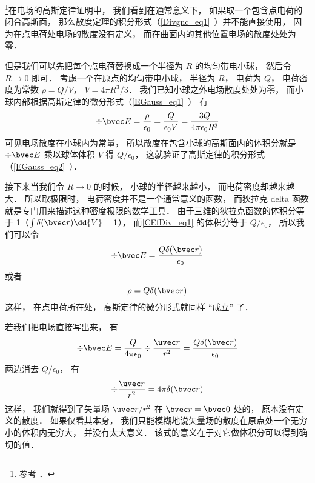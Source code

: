 

\footnote{参考 \cite{GriffE}．}在电场的高斯定律证明中， 我们看到在通常意义下， 如果取一个包含点电荷的闭合高斯面， 那么散度定理的积分形式（\autoref{Divgnc_eq1}~）并不能直接使用， 因为在点电荷处电场的散度没有定义， 而在曲面内的其他位置电场的散度处处为零．

但是我们可以先把每个点电荷替换成一个半径为 $R$ 的均匀带电小球， 然后令 $R\to 0$ 即可． 考虑一个在原点的均匀带电小球， 半径为 $R$， 电荷为 $Q$， 电荷密度为常数 $\rho = Q/V$， $V = 4\pi R^3/3$． 我们已知小球之外电场散度处处为零， 而小球内部根据高斯定律的微分形式（\autoref{EGauss_eq1}~） 有
\begin{equation}\label{CEfDiv_eq1}
\div \bvec E = \frac{\rho}{\epsilon_0} = \frac{Q}{\epsilon_0 V} = \frac{3Q}{4\pi \epsilon_0 R^3}
\end{equation}
可见电场散度在小球内为常量， 所以散度在包含小球的高斯面内的体积分就是 $\div \bvec E$ 乘以球体体积 $V$ 得 $Q/\epsilon_0$， 这就验证了高斯定律的积分形式（\autoref{EGauss_eq2}~）．

接下来当我们令 $R\to 0$ 的时候， 小球的半径越来越小， 而电荷密度却越来越大． 所以取极限时， 电荷密度并不是一个通常意义的函数， 而狄拉克 delta 函数就是专门用来描述这种密度极限的数学工具． 由于三维的狄拉克函数的体积分等于 1（$\int \delta(\bvec r)\dd{V} = 1$）， 而\autoref{CEfDiv_eq1} 的体积分等于 $Q/\epsilon_0$， 所以我们可以令
\begin{equation}
\div \bvec E = \frac{Q\delta(\bvec r)}{\epsilon_0}
\end{equation}
或者
\begin{equation}
\rho = Q\delta(\bvec r)
\end{equation}
这样， 在点电荷所在处， 高斯定律的微分形式就同样 “成立” 了．

若我们把电场直接写出来， 有
\begin{equation}
\div \bvec E = \frac{Q}{4\pi\epsilon_0}\div \frac{\uvec r}{r^2} = \frac{Q\delta(\bvec r)}{\epsilon_0}
\end{equation}
两边消去 $Q/\epsilon_0$， 有
\begin{equation}\label{CEfDiv_eq2}
\div \frac{\uvec r}{r^2} = 4\pi\delta(\bvec r)
\end{equation}
这样， 我们就得到了矢量场 ${\uvec r}/{r^2}$ 在 $\bvec r = \bvec 0$ 处的， 原本没有定义的散度． 如果仅看其本身， 我们只能模糊地说矢量场的散度在原点处一个无穷小的体积内无穷大， 并没有太大意义． 该式的意义在于对它做体积分可以得到确切的值．
